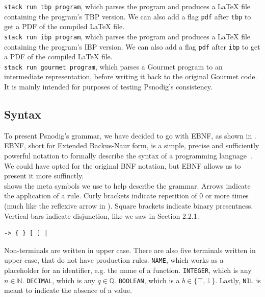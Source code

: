 \texttt{stack run tbp program}, which parses the program and produces a LaTeX file containing the program's TBP version. We can also add a flag \texttt{pdf} after \texttt{tbp} to get a PDF of the compiled LaTeX file. \\

\texttt{stack run ibp program}, which parses the program and produces a LaTeX file containing the program's IBP version. We can also add a flag \texttt{pdf} after \texttt{ibp} to get a PDF of the compiled LaTeX file. \\

\texttt{stack run gourmet program}, which parses a Gourmet program to an intermediate representation, before writing it back to the original Gourmet code. It is mainly intended for purposes of testing Psnodig's consistency.

\subsection{Syntax}

To present Psnodig's grammar, we have decided to go with EBNF, as shown in . EBNF, short for Extended Backus-Naur form, is a simple, precise and sufficiently powerful notation to formally describe the syntax of a programming language~\cite{whatIsEBNF}. We could have opted for the original BNF notation, but EBNF allows us to present it more suffinctly. \\

 shows the meta symbols we use to help describe the grammar. Arrows indicate the application of a rule. Curly brackets indicate repetition of 0 or more times (much like the reflexive arrow in ). Square brackets indicate binary presentness. Vertical bars indicate disjunction, like we saw in Section 2.2.1. \\

\begin{lstlisting}[caption={Meta symbols used to describe Psnodig's grammar.}, captionpos=b, label={Meta symbols used to describe Psnodig's grammar.}]
-> { } [ ] |
\end{lstlisting}

Non-terminals are written in upper case. There are also five terminals written in upper case, that do not have production rules. \texttt{NAME}, which works as a placeholder for an identifier, e.g. the name of a function. \texttt{INTEGER}, which is any $n \in \mathbb{N}$. \texttt{DECIMAL}, which is any $q \in \mathbb{Q}$. \texttt{BOOLEAN}, which is a $b \in \{\top, \bot \}$. Lastly, \texttt{NIL} is meant to indicate the absence of a value. \\

